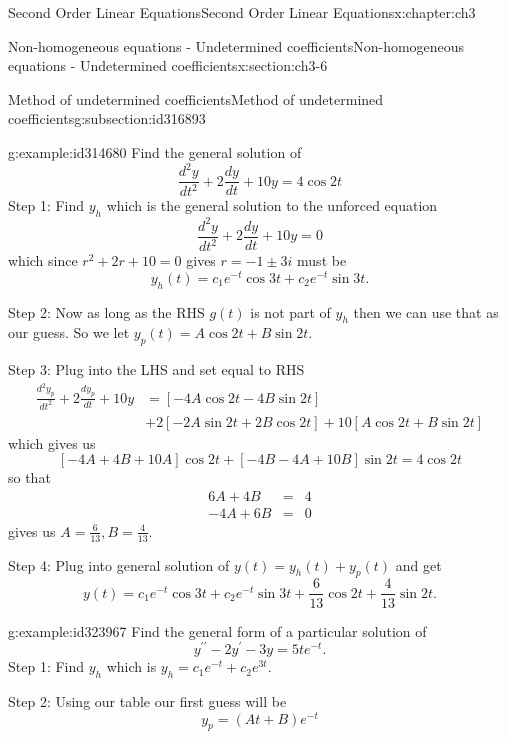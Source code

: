 \documentclass[oneside,10pt,]{book}
\numberwithin{equation}{section}
\numberwithin{equation}{section}
\newcommand{\amp}{&}
\begin{document}
\begin{chapterptx}{Second Order Linear Equations}{}{Second Order Linear Equations}{}{}{x:chapter:ch3}
\begin{sectionptx}{Non-homogeneous equations - Undetermined coefficients}{}{Non-homogeneous equations - Undetermined coefficients}{}{}{x:section:ch3-6}
\begin{subsectionptx}{Method of undetermined coefficients}{}{Method of undetermined coefficients}{}{}{g:subsection:id316893}
\begin{example}{}{g:example:id314680}
Find the general solution of%
\begin{equation*}
\frac{d^{2}y}{dt^{2}}+2\frac{dy}{dt}+10y=4\cos2t
\end{equation*}
Step 1: Find \(y_{h}\) which is the general solution to the unforced equation%
\begin{equation*}
\frac{d^{2}y}{dt^{2}}+2\frac{dy}{dt}+10y=0
\end{equation*}
which since \(r^{2}+2r+10=0\) gives \(r=-1\pm3i\) must be%
\begin{equation*}
y_{h}(t)=c_{1}e^{-t}\cos3t+c_{2}e^{-t}\sin3t.
\end{equation*}
%
\par
Step 2: Now as long as the RHS \(g(t)\) is not part of \(y_{h}\) then we can use that as our guess. So we let \(y_{p}(t)=A\cos2t+B\sin2t\).%
\par
Step 3: Plug into the LHS and set equal to RHS%
\begin{align*}
\frac{d^{2}y_{p}}{dt^{2}}+2\frac{dy_{p}}{dt}+10y \amp = \left[-4A\cos2t-4B\sin2t\right]\\
\amp +2\left[-2A\sin2t+2B\cos2t\right]+10\left[A\cos2t+B\sin2t\right]
\end{align*}
which gives us%
\begin{equation*}
\left[-4A+4B+10A\right]\cos2t+\left[-4B-4A+10B\right]\sin2t=4\cos2t
\end{equation*}
so that%
\begin{align*}
6A+4B \amp = \amp 4\\
-4A+6B \amp = \amp 0
\end{align*}
gives us \(A=\frac{6}{13},B=\frac{4}{13}\).%
\par
Step 4: Plug into general solution of \(y(t)=y_{h}(t)+y_{p}(t)\) and get%
\begin{equation*}
y(t)=c_{1}e^{-t}\cos3t+c_{2}e^{-t}\sin3t+\frac{6}{13}\cos2t+\frac{4}{13}\sin2t.
\end{equation*}
%
\end{example}
\begin{example}{}{g:example:id323967}%
Find the general form of a particular solution of%
\begin{equation*}
y^{\prime\prime}-2y^{\prime}-3y=5te^{-t}.
\end{equation*}
Step 1: Find \(y_{h}\) which is \(y_{h}=c_{1}e^{-t}+c_{2}e^{3t}\).%
\par
Step 2: Using our table our first guess will be%
\begin{equation*}
y_{p}=\left(At+B\right)e^{-t}
\end{equation*}

\end{example}
\end{subsectionptx}
\end{sectionptx}
\end{chapterptx}
\end{document}
